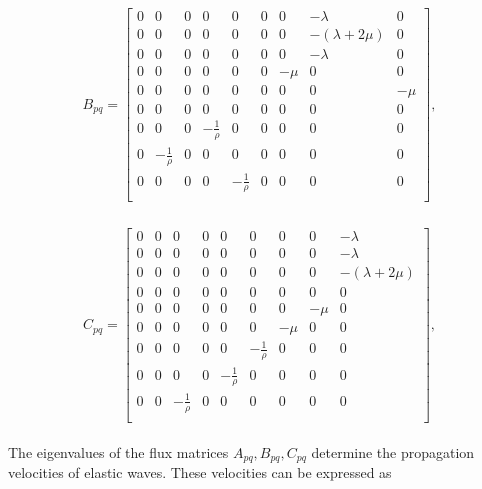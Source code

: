 \begin{align}
    \begin{split}
    B_{pq} = 
        \begin{bmatrix}
        0 & 0 & 0 & 0 & 0 & 0 & 0 & -\lambda & 0 \\
        0 & 0 & 0 & 0 & 0 & 0 & 0 & -\left(\lambda + 2\mu\right) & 0 \\
        0 & 0 & 0 & 0 & 0 & 0 & 0 & -\lambda & 0 \\
        0 & 0 & 0 & 0 & 0 & 0 & -\mu & 0 & 0 \\
        0 & 0 & 0 & 0 & 0 & 0 & 0 & 0 & -\mu \\
        0 & 0 & 0 & 0 & 0 & 0 & 0 & 0 & 0 \\
        0 & 0 & 0 & -\frac{1}{\rho} & 0 & 0 & 0 & 0 & 0 \\
        0 & -\frac{1}{\rho} & 0 & 0 & 0 & 0 & 0 & 0 & 0 \\
        0 & 0 & 0 & 0 & -\frac{1}{\rho} & 0 & 0 & 0 & 0 \\
    \end{bmatrix},
    \end{split}
    \label{eq:fluxmatrixB}
\end{align}

\begin{align}
    \begin{split}
    C_{pq} = 
        \begin{bmatrix}
        0 & 0 & 0 & 0 & 0 & 0 & 0 & 0 & -\lambda \\
        0 & 0 & 0 & 0 & 0 & 0 & 0 & 0 & -\lambda \\
        0 & 0 & 0 & 0 & 0 & 0 & 0 & 0 & -\left(\lambda + 2\mu\right) \\
        0 & 0 & 0 & 0 & 0 & 0 & 0 & 0 & 0 \\
        0 & 0 & 0 & 0 & 0 & 0 & 0 & -\mu & 0 \\
        0 & 0 & 0 & 0 & 0 & 0 & -\mu & 0 & 0 \\
        0 & 0 & 0 & 0 & 0 & -\frac{1}{\rho} & 0 & 0 & 0 \\
        0 & 0 & 0 & 0 & -\frac{1}{\rho} & 0 & 0 & 0 & 0 \\
        0 & 0 & -\frac{1}{\rho} & 0 & 0 & 0 & 0 & 0 & 0 \\
    \end{bmatrix},
    \end{split}
    \label{eq:fluxmatrixC}
\end{align}

The eigenvalues of the flux matrices $A_{pq}, B_{pq}, C_{pq}$ determine the propagation velocities of elastic waves. These velocities can be expressed as

